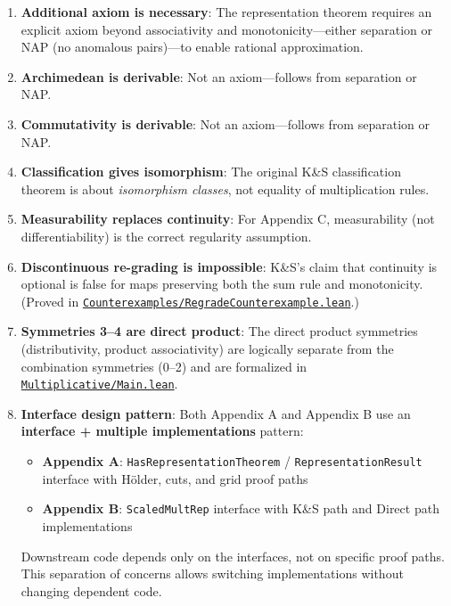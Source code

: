 \documentclass[11pt]{article}
\theoremstyle{definition}
\theoremstyle{remark}
\begin{document}
\begin{enumerate}
\textbf{Status}: minimum identity is sufficient for nonnegativity, not necessary.
\texttt{positive\_no\_left\_identity} and \texttt{positive\_no\_minimum} separate these claims.''

\item \textbf{Additional axiom is necessary}: The representation theorem requires an explicit axiom beyond associativity and monotonicity---either separation or NAP (no anomalous pairs)---to enable rational approximation.

\item \textbf{Archimedean is derivable}: Not an axiom---follows from separation or NAP.

\item \textbf{Commutativity is derivable}: Not an axiom---follows from separation or NAP.

\item \textbf{Classification gives isomorphism}: The original K\&S classification theorem is about \emph{isomorphism classes}, not equality of multiplication rules.

\item \textbf{Measurability replaces continuity}: For Appendix C, measurability (not differentiability) is the correct regularity assumption.

\item \textbf{Discontinuous re-grading is impossible}: K\&S's claim that continuity is optional is false
for maps preserving both the sum rule and monotonicity.
\\
(Proved in \href{https://github.com/zariuq/ks-foundations-of-inference/blob/main/KnuthSkilling/Counterexamples/RegradeCounterexample.lean}{\texttt{Counterexamples/RegradeCounterexample.lean}}.)

\item \textbf{Symmetries 3--4 are direct product}: The direct product symmetries (distributivity, product associativity) are logically separate from the combination symmetries (0--2) and are formalized in \href{https://github.com/zariuq/ks-foundations-of-inference/blob/main/KnuthSkilling/Multiplicative/Main.lean}{\texttt{Multiplicative/Main.lean}}.

\item \textbf{Interface design pattern}: Both Appendix A and Appendix B use an \textbf{interface + multiple implementations} pattern:
\begin{itemize}
\item \textbf{Appendix A}: \texttt{HasRepresentationTheorem} / \texttt{RepresentationResult} interface with Hölder, cuts, and grid proof paths
\item \textbf{Appendix B}: \texttt{ScaledMultRep} interface with K\&S path and Direct path implementations
\end{itemize}
Downstream code depends only on the interfaces, not on specific proof paths. This separation of concerns
allows switching implementations without changing dependent code.
\end{enumerate}
\end{document}
